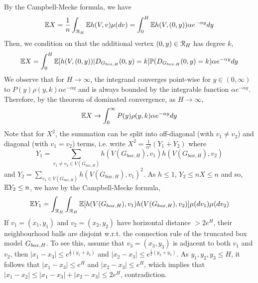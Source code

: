 By the Campbell-Mecke formula, we have
\begin{align*}
\mathbb{E} X = \frac{1}{n}\int_{{\mathcal R}_H} \mathbb{E} h(V,v) \mu(dv) = \int_0^H \mathbb{E} h(V,(0,y))\alpha e^{-\alpha y} dy
\end{align*}
Then, we condition on that the additional vertex $(0,y) \in {\mathcal R}_H$ has degree $k$,
\begin{align*}
\mathbb{E} X = \int_0^H \mathbb{E}[h(V,(0,y))|D_{G_{box,H}}(0,y)=k]\mathbb{P}(D_{G_{box,H}}(0,y)=k)\alpha e^{-\alpha y}dy
\end{align*}
We observe that for $H \rightarrow \infty$, the integrand converges point-wise for $y \in (0,\infty)$ to $P(y)\rho(y,k)\alpha e^{-\alpha y}$ and is always bounded by the integrable function $\alpha e^{-\alpha y}$.
Therefore, by the theorem of dominated convergence, as $H \rightarrow \infty$,
\begin{align*}
\mathbb{E} X \rightarrow \int_0^\infty P(y)\rho(y,k)\alpha e^{-\alpha y}dy
\end{align*}
Note that for $X^2$, the summation can be split into off-diagonal (with $v_1 \not = v_2$) and diagonal (with $v_1=v_2$) terms, i.e. write $X^2 = \frac{1}{n^2}(Y_1+Y_2)$ where 
$$Y_1 = \sum_{v_1 \not = v_2 \in V(G_{box,H})} h(V(G_{box,H}),v_1)h(V(G_{box,H}),v_2)$$ and $Y_2 = \sum_{v_1 \in V(G_{box,H})} h(V(G_{box,H}),v_1)^2$. As $h \leq 1$, $Y_2 \leq n X\leq n$ and so, $\mathbb{E} Y_2 \leq n$, we have by the Campbell-Mecke formula,
\begin{align*}
\mathbb{E} Y_1 = \int_{{\mathcal R}_H} \int_{{\mathcal R}_H} \mathbb{E}[h(V(G_{box,H}),v_1)h(V(G_{box,H}),v_2)]\mu(dv_1)\mu(dv_2)
\end{align*}
If $v_1=(x_1,y_1)$ and $v_2=(x_2,y_2)$ have horizontal distance $>2e^H$, their neighbourhood balls are disjoint w.r.t. the connection rule of the truncated box model $G_{box,H}$. To see this, assume that $v_3=(x_3,y_3)$ is adjacent to both $v_1$ and $v_2$, then $|x_1-x_3|\leq e^{\frac{1}{2}(y_1+y_3)}$ and $|x_2-x_3|\leq e^{\frac{1}{2}(y_2+y_3)}$. As $y_1, y_2, y_3 \leq H$, it follows that $|x_1-x_3| \leq e^H$ and $|x_2-x_3|\leq e^H$, which implies that $|x_1-x_2| \leq |x_1-x_3|+|x_2-x_3|\leq 2e^H$, contradiction.

